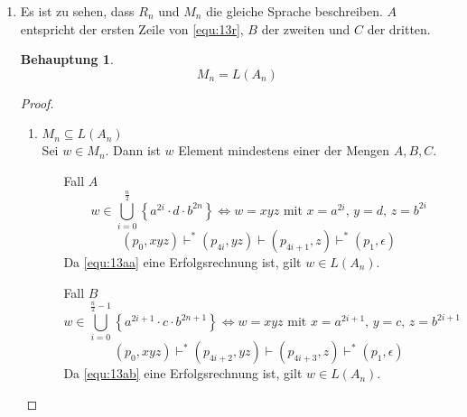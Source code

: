 \documentclass[a4paper]{scrartcl}
\newtheorem*{behaupt}{Behauptung}
\begin{document}
\begin{enumerate}
    \item
        Es ist zu sehen, dass $R_n$ und $M_n$ die gleiche Sprache beschreiben.
        $A$ entspricht der ersten Zeile von \eqref{equ:13r}, $B$ der zweiten
        und $C$ der dritten.
        \begin{behaupt}
            \begin{equation}
                M_n = L(A_n)
            \end{equation}
        \end{behaupt}
        \begin{proof} \hfill \\
            \begin{enumerate}
                \item $M_n \subseteq L(A_n)$ \\
                    Sei $w \in M_n$.
                    Dann ist $w$ Element mindestens einer der Mengen $A,B,C$.
                    \begin{enumerate}
                        \item[Fall $A$] 
                            \begin{equation}
                                w \in \bigcup_{i=0}^{\frac{n}{2}} \left\{ a^{2i} \cdot d \cdot b^{2n} \right\} \Leftrightarrow w = xyz \text{ mit } x = a^{2i} \text{, } y = d \text{, } z = b^{2i}
                            \end{equation}
                            \begin{equation}
                                \label{equ:13aa}
                                (p_0, xyz) \vdash^* (p_{4i}, yz) \vdash (p_{4i+1}, z) \vdash^* (p_1, \epsilon)
                            \end{equation}
                            Da \eqref{equ:13aa} eine Erfolgsrechnung ist, gilt $w \in L(A_n)$.

                        \item[Fall $B$] 
                            \begin{equation}
                                w \in \bigcup_{i=0}^{\frac{n}{2}-1} \left\{ a^{2i+1} \cdot c \cdot b^{2n+1} \right\} \Leftrightarrow w = xyz \text{ mit } x = a^{2i+1} \text{, } y = c \text{, } z = b^{2i+1}
                            \end{equation}
                            \begin{equation}
                                \label{equ:13ab}
                                (p_0, xyz) \vdash^* (p_{4i+2}, yz) \vdash (p_{4i+3}, z) \vdash^* (p_1, \epsilon)
                            \end{equation}
                            Da \eqref{equ:13ab} eine Erfolgsrechnung ist, gilt $w \in L(A_n)$.


\end{enumerate}
\end{enumerate}
\end{proof}
\end{enumerate}
\end{document}
